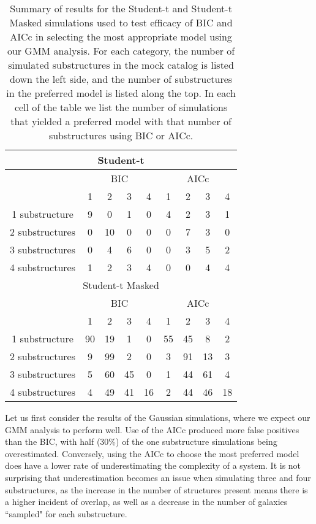 \documentclass[onecolumn]{aastex}
\begin{document}
\begin{table}
\centering
\caption{Summary of results for the Student-t and Student-t Masked simulations used to test efficacy of BIC and AICc in selecting the most appropriate model using our GMM analysis.  For each category, the number of simulated substructures in the mock catalog is listed down the left side, and the number of substructures in the preferred model is listed along the top.  In each cell of the table we list the number of simulations that yielded a preferred model with that number of substructures using BIC or AICc.}
\label{tab:GMMResults2}
\begin{tabular}{c|cccc|cccc}
\hline
\hline
\multicolumn{9}{c}{Student-t} \\ \hline
 & \multicolumn{4}{c|}{BIC} & \multicolumn{4}{c}{AICc}\\ \hline
 & 1 & 2 & 3 & 4 & 1 & 2 & 3 & 4 \\ \hline
1 substructure  & 9 & 0 & 1 & 0  & 4 & 2 & 3 & 1 \\
2 substructures & 0 & 10 & 0 & 0  & 0 & 7 & 3 & 0 \\
3 substructures & 0 & 4 & 6 & 0  & 0 & 3 & 5 & 2 \\
4 substructures & 1 & 2 & 3 & 4  & 0 & 0 & 4 & 4 \\
\hline
\hline
\multicolumn{9}{c}{Student-t Masked} \\ \hline
 & \multicolumn{4}{c|}{BIC} & \multicolumn{4}{c}{AICc}\\ \hline
 & 1 & 2 & 3 & 4 & 1 & 2 & 3 & 4 \\ \hline
1 substructure  & 90 & 19 & 1 & 0  & 55 & 45 & 8 & 2 \\
2 substructures & 9 & 99 & 2 & 0  & 3 & 91 & 13 & 3 \\
3 substructures & 5 & 60 & 45 & 0  & 1 & 44 & 61 & 4 \\
4 substructures & 4 & 49 & 41 & 16  & 2 & 44 & 46 & 18 \\
\hline
\end{tabular}
\end{table}

Let us first consider the results of the Gaussian simulations, where we expect our GMM analysis to perform well.  Use of the AICc produced more false positives than the BIC, with half (30\%) of the one substructure simulations being overestimated.  Conversely, using the AICc to choose the most preferred model does have a lower rate of underestimating the complexity of a system.  It is not surprising that underestimation becomes an issue when simulating three and four substructures, as the increase in the number of structures present means there is a higher incident of overlap, as well as a decrease in the number of galaxies ``sampled" for each substructure.
\end{document}
